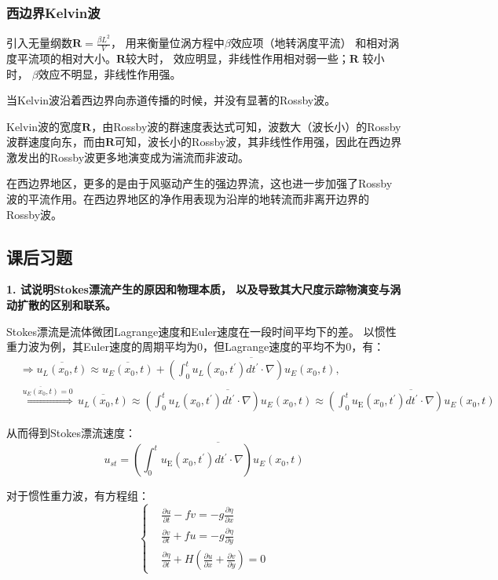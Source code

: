 \documentclass{article}
\begin{document}
\subsubsection{西边界Kelvin波}
引入无量纲数$\mathbf{R}=\frac{\beta L^2}{V}$，
用来衡量位涡方程中$\beta$效应项（地转涡度平流）
和相对涡度平流项的相对大小。$\mathbf{R}$较大时， 
效应明显，非线性作用相对弱一些；$\mathbf{R}$ 较小时，
$\beta$效应不明显，非线性作用强。

当Kelvin波沿着西边界向赤道传播的时候，并没有显著的Rossby波。

Kelvin波的宽度$\mathbf{R}$，由Rossby波的群速度表达式可知，波数大（波长小）的Rossby波群速度向东，而由$\mathbf{R}$可知，波长小的Rossby波，其非线性作用强，因此在西边界激发出的Rossby波更多地演变成为湍流而非波动。

在西边界地区，更多的是由于风驱动产生的强边界流，这也进一步加强了Rossby波的平流作用。在西边界地区的净作用表现为沿岸的地转流而非离开边界的Rossby波。

\subsection{课后习题}
\textbf{1. 试说明Stokes漂流产生的原因和物理本质，
以及导致其大尺度示踪物演变与涡动扩散的区别和联系。}

Stokes漂流是流体微团Lagrange速度和Euler速度在一段时间平均下的差。
以惯性重力波为例，其Euler速度的周期平均为0，但Lagrange速度的平均不为0，有：
\begin{align}
   & \Rightarrow \overline{{{u}_{L}}({{x}_{0}},t)}
   \approx \overline{{{u}_{E}}({{x}_{0}},t)}
   +\overline{(\int_{0}^{t}{{{u}_{L}}({{x}_{0}},t^{\prime})}dt^{\prime}\cdot \nabla ){{u}_{E}}({{x}_{0}},t)}, \\ 
   & \overset{\overline{{{u}_{E}}({{x}_{0}},t)}=0}{\mathop{\Rightarrow }}\,\overline{{{u}_{L}}({{x}_{0}},t)}\approx
    \overline{(\int_{0}^{t}{{{u}_{L}}({{x}_{0}},t^{\prime})}dt^{\prime}\cdot \nabla ){{u}_{E}}({{x}_{0}},t)}\approx 
    \overline{(\int_{0}^{t}{{{u}_{\text{E}}}({{x}_{0}},t^{\prime})}dt^{\prime}\cdot \nabla ){{u}_{E}}({{x}_{0}},t)}
\end{align}

从而得到Stokes漂流速度：
$$u_{st}=\overline{(\int_{0}^{t}{{{u}_{\text{E}}}({{x}_{0}},t^{\prime})}dt^{\prime}\cdot \nabla ){{u}_{E}}({{x}_{0}},t)}$$

对于惯性重力波，有方程组：
$$\begin{cases}
    &\frac{\partial u}{\partial t}-fv=-g\frac{\partial \eta}{\partial x}\\
    &\frac{\partial v}{\partial t}+fu=-g\frac{\partial \eta}{\partial y}\\
    &\frac{\partial \eta}{\partial t}+H(\frac{\partial u}{\partial x}+\frac{\partial v}{\partial y} ) = 0
\end{cases}$$
\end{document}
